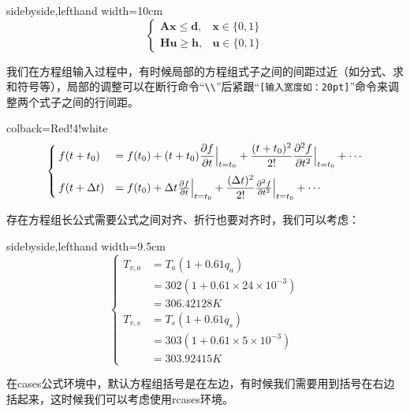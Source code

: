 \documentclass[UTF8,
no-math,
12pt,
openany,
table,
dvipsnames,
svgnames]{article}
\begin{document}
\begin{tcblisting}{sidebyside,lefthand width=10cm}
\begin{equation*}
\begin{cases}
{{\bm{Ax}}}\leq {\bm d},& {\bm x}\in\{0, 1\}\\
{\bm{Hu}}\geq {{\bm h}},& {\bm u}\in \{0, 1\}
\end{cases}
\end{equation*}
\end{tcblisting}

我们在方程组输入过程中，有时候局部的方程组式子之间的间距过近（如分式、求和符号等），局部的调整可以在断行命令“\verb|\\|”后紧跟“\verb|[输入宽度如：20pt]|”命令来调整两个式子之间的行间距。
\begin{tcblisting}{colback=Red!4!white}
\begin{equation*}
\begin{cases}
f(t+t_0)& =f(t_0) + (t+t_0)\dfrac{\partial f}{\partial t}\Big{|}_{t=t_0}+ \dfrac{(t+t_0)^2}{2!} \dfrac{\partial^2 f}{\partial t^2}\Big{|}_{t=t_0}+\cdots\\[10pt]
f(t+\Delta t) & = f(t_0) + \Delta t \frac{\partial f}{\partial t}\Big{|}_{t=t_0}+ \dfrac{(\Delta t)^2}{2!} \frac{\partial^2 f}{\partial t^2}\Big{|}_{t=t_0} + \cdots
\end{cases}
\end{equation*}
\end{tcblisting}

存在方程组长公式需要公式之间对齐、折行也要对齐时，我们可以考虑：

\begin{tcblisting}{sidebyside,lefthand width=9.5cm}
\begin{equation*}
\begin{cases}
T_{v,a} &= T_a(1+0.61q_a)\\
        &= 302(1+0.61 \times 24 \times 10^{-3})\\
        &= 306.42128 K\\
T_{v,s} &= T_s(1+0.61q_s)\\
        &= 303(1+0.61 \times 5 \times 10^{-3})\\
        &= 303.92415 K
\end{cases}
\end{equation*}
\end{tcblisting}

在cases公式环境中，默认方程组括号是在左边，有时候我们需要用到括号在右边括起来，这时候我们可以考虑使用rcases环境。
\end{document}
